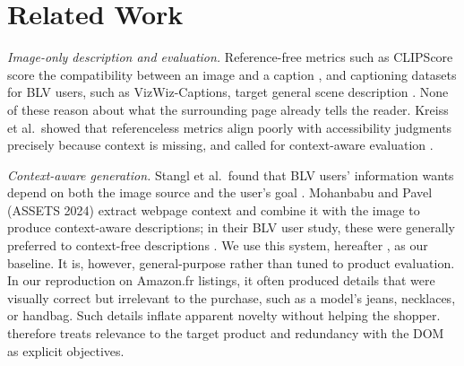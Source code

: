 \section{Related Work}
\textit{Image-only description and evaluation.} Reference-free metrics such as CLIPScore score the compatibility between an image and a caption \cite{hessel2021}, and captioning datasets for BLV users, such as VizWiz-Captions, target general scene description \cite{gurari2020}. None of these reason about what the surrounding page already tells the reader. Kreiss et al.\ showed that referenceless metrics align poorly with accessibility judgments precisely because context is missing, and called for context-aware evaluation \cite{kreiss2022}.

\textit{Context-aware generation.} Stangl et al.\ found that BLV users' information wants depend on both the image source and the user's goal \cite{stangl2021}. Mohanbabu and Pavel (ASSETS 2024) extract webpage context and combine it with the image to produce context-aware descriptions; in their BLV user study, these were generally preferred to context-free descriptions \cite{mohanbabu2024}. We use this system, hereafter \base, as our baseline. It is, however, general-purpose rather than tuned to product evaluation. In our reproduction on Amazon.fr listings, it often produced details that were visually correct but irrelevant to the purchase, such as a model's jeans, necklaces, or handbag. Such details inflate apparent novelty without helping the shopper. \sys therefore treats relevance to the target product and redundancy with the DOM as explicit objectives.
